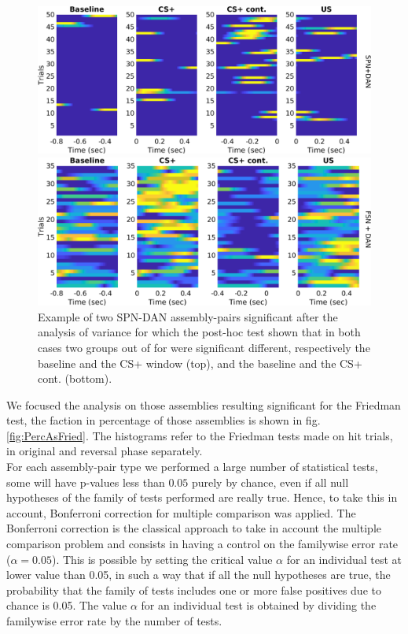 \begin{figure}
    \centering
    \includegraphics[scale=0.4]{figures/SPN_DANexPreRew.png}
    
   \vspace{1cm}
   
   \includegraphics[scale=0.4]{figures/FSN_DANexStimRew.png}
    \caption{Example of two SPN-DAN assembly-pairs significant after the analysis of variance for which the post-hoc test shown that in both cases two groups out of for were significant different, respectively the baseline and the CS+ window (top), and the baseline and the CS+ cont. (bottom).}
    \label{fig:SPN_Ex}
\end{figure}
We focused the analysis on those assemblies resulting significant for the Friedman test, the faction in percentage of those assemblies is shown in fig.\ref{fig:PercAsFried}. The histograms refer to the Friedman tests made on hit trials, in original and reversal phase separately.\\For each assembly-pair type we performed a large number of statistical tests, some will have p-values less than $0.05$ purely by chance, even if all null hypotheses of the family of tests performed are really true. Hence, to take this in account, Bonferroni correction for multiple comparison was applied. The Bonferroni correction is the classical approach to take in account the multiple comparison problem and consists in having a control on the familywise error rate ($\alpha=0.05$). This is possible by setting the critical value $\alpha$ for an individual test at lower value than 0.05, in such a way that if all the null hypotheses are true, the probability that the family of tests includes one or more false positives due to chance is 0.05. The value $\alpha$ for an individual test is obtained by dividing the familywise error rate by the number of tests.\\
